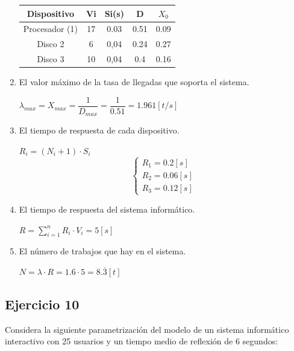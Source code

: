 \begin{enumerate}
\begin{tcolorbox}[colback=white,colframe=cyan!50!black,fonttitle=\bfseries]
\begin{table}[H]
\begin{tabular}{|c|c|c|c|c|}
    \textbf{Dispositivo} & \textbf{Vi} & \textbf{Si(s)} & \textbf{D} & \textbf{$X_0$}\\ \hline
    Procesador (1) & 17 & 0.03 & 0.51 & 0.09\\ \hline
    Disco 2        & 6  & 0,04 & 0.24 & 0.27\\ \hline
    Disco 3        & 10 & 0,04 & 0.4  & 0.16\\ \hline
    \end{tabular}\end{table}
    \end{tcolorbox}
    \item El valor máximo de la tasa de llegadas que soporta el sistema.
    \begin{tcolorbox}[colback=white,colframe=cyan!50!black,fonttitle=\bfseries]
    $\lambda_{max}=X_{max}=\dfrac{1}{D_{max}}= \dfrac{1}{0.51}= 1.961[t/s]$
    \end{tcolorbox}
    \item El tiempo de respuesta de cada dispositivo.
    \begin{tcolorbox}[colback=white,colframe=cyan!50!black,fonttitle=\bfseries]
    $R_i=(N_i+1)\cdot S_i$
    \[
    \left\{
                \begin{array}{l}
                  R_1 = 0.2[s]\\
                  R_2 = 0.06[s]\\
                  R_3 = 0.12[s]
                \end{array}
                \right.
    \]
    \end{tcolorbox}
    \item El tiempo de respuesta del sistema informático.
    \begin{tcolorbox}[colback=white,colframe=cyan!50!black,fonttitle=\bfseries]
    $R=\sum_{i=1}^nR_i\cdot V_i=5[s]$
    \end{tcolorbox}
    \item El número de trabajos que hay en el sistema.
    \begin{tcolorbox}[colback=white,colframe=cyan!50!black,fonttitle=\bfseries]
    $N=\lambda\cdot R=1.6\cdot5=8.\overline{3}[t]$
    \end{tcolorbox}
\end{enumerate}
\subsection{Ejercicio 10}
Considera la siguiente parametrización del modelo de un sistema informático interactivo con 25 usuarios y un tiempo medio de reflexión de 6 segundos:

